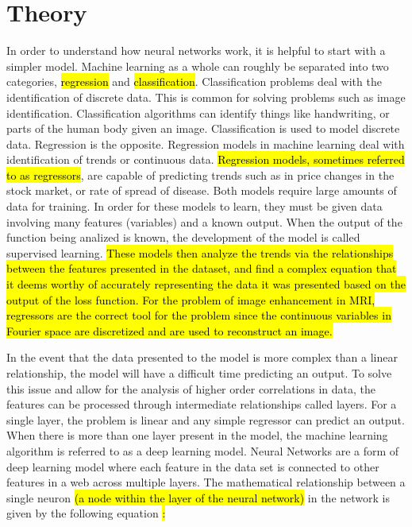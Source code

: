 \documentclass[14pt]{extreport}
\begin{document}
    \section*{Theory}
        In order to understand how neural networks work, it is helpful to start with a simpler model. Machine learning as a whole can roughly be separated into two categories, \hl{regression} and \hl{classification}. Classification problems deal with the identification of discrete data. This is common for solving problems such as image identification. Classification algorithms can identify things like handwriting, or parts of the human body given an image. Classification is used to model discrete data. Regression is the opposite. Regression models in machine learning deal with identification of trends or continuous data. \hl{Regression models, sometimes referred to as regressors}, are capable of predicting trends such as in price changes in the stock market, or rate of spread of disease. Both models require large amounts of data for training. In order for these models to learn, they must be given data involving many features (variables) and a known output. When the output of the function being analized is known, the development of the model is called supervised learning. \hl{These models then analyze the trends via the relationships between the features presented in the dataset, and find a complex equation that it deems worthy of accurately representing the data it was presented based on the output of the loss function. For the problem of image enhancement in MRI, regressors are the correct tool for the problem since the continuous variables in Fourier space are discretized and are used to reconstruct an image.}

        In the event that the data presented to the model is more complex than a linear relationship, the model will have a difficult time predicting an output\cite{Raschka_2022}. To solve this issue and allow for the analysis of higher order correlations in data, the features can be processed through intermediate relationships called layers. For a single layer, the problem is linear and any simple regressor can predict an output. When there is more than one layer present in the model, the machine learning algorithm is referred to as a deep learning model. Neural Networks are a form of deep learning model where each feature in the data set is connected to other features in a web across multiple layers. The mathematical relationship between a single neuron \hl{(a node within the layer of the neural network)} in the network is given by the following equation \cite{Gazit_2024}\hl{:}
        
\end{document}
